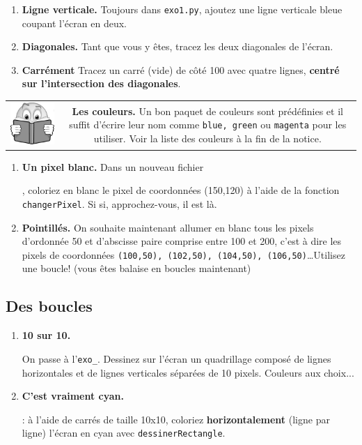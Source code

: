 \documentclass[11pt,a4paper]{article}
\newcommand{\checkbox}{$\square$ \smallskip}
\newenvironment{lecture}{%
\smallskip
\begin{tabular}{c|c}
    \hspace{.03\textwidth} \includegraphics[width=.07\textwidth]{img/lecture.jpg} & 
\begin{minipage}{.85\textwidth}
}{%
\end{minipage}
\end{tabular}
}
\newcounter{exo} \setcounter{exo}{0}
\newenvironment{action}{%
    \begin{enumerate}[\numerotation] \addtocounter{exo}{-1}%
        }{%
    \end{enumerate}
}
\newcommand{\numexoa}{\theexo \addtocounter{exo}{1}}
\newcommand{\numerotation}{\checkbox \smallskip \numexoa.}
\newcounter{exoo} \setcounter{exoo}{0}
\newcommand{\numexo}{\theexoo}
\newcommand{\repexo}{{\tt exo_\numexo}}
\newcommand{\exoplus}{\addtocounter{exoo}{1}}
\begin{document}
\begin{action}
\item {\bf Ligne verticale.} Toujours dans {\tt exo1.py}, ajoutez une ligne verticale bleue coupant l'écran en deux.
\item {\bf Diagonales.} Tant que vous y êtes, tracez les deux diagonales de l'écran.
\item {\bf Carrément} Tracez un carré (vide) de côté 100 avec quatre lignes, {\bf centré sur l'intersection des diagonales}.
\end{action}

\begin{lecture}
    {\bf Les couleurs.} Un bon paquet de couleurs sont prédéfinies et il suffit d'écrire leur nom comme {\tt blue, green} ou {\tt magenta} pour les utiliser. Voir la liste des couleurs à la fin de la notice.
\end{lecture}

\begin{action}
\item {\bf Un pixel blanc.} Dans un nouveau fichier \exoplus \repexo, coloriez en blanc le pixel de coordonnées (150,120) à l'aide de la fonction {\tt changerPixel}. Si si, approchez-vous, il est là.
\item {\bf Pointillés.} On souhaite maintenant allumer en blanc tous les pixels d'ordonnée 50 et d'abscisse paire comprise entre 100 et 200, c'est à dire les pixels de coordonnées {\tt (100,50), (102,50), (104,50), (106,50)}\dots Utilisez une boucle! (vous êtes balaise en boucles maintenant)
\end{action}

\subsection*{Des boucles}
\begin{action}
\item {\bf 10 sur 10.} \exoplus On passe à l'\repexo. 
Dessinez sur l'écran un quadrillage composé de lignes horizontales et de lignes verticales séparées de 10 pixels. Couleurs aux choix...
\item {\bf C'est vraiment cyan.} \exoplus \repexo : à l'aide de carrés de taille 10x10, coloriez {\bf horizontalement} (ligne par ligne) l'écran en cyan avec {\tt dessinerRectangle}. 
\end{action}
\end{document}
